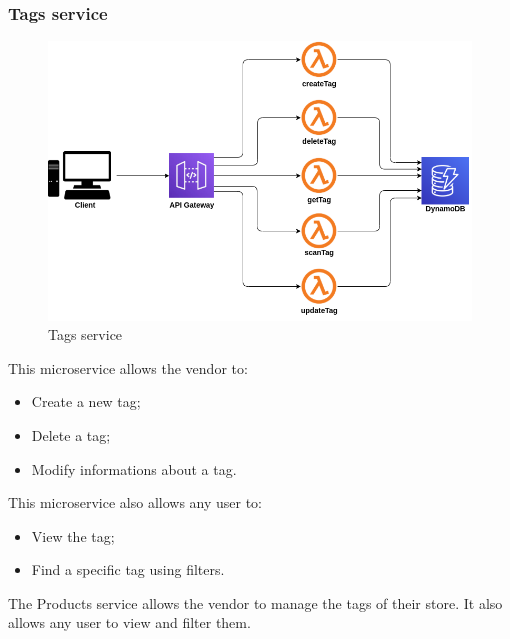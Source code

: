 \subsubsection{Tags service}
\begin{figure}[!h]
    \vspace{5px}
    \includegraphics[scale=0.5]{../../../../Images/Diagrammi/maintainerManual/tagsService.png}
    \centering
    \caption{Tags service}
\end{figure}
This microservice allows the vendor to:
\begin{itemize}
    \item Create a new tag;
    \item Delete a tag;
    \item Modify informations about a tag.
\end{itemize}
This microservice also allows any user to:
\begin{itemize}
    \item View the tag;
    \item Find a specific tag using filters.
\end{itemize}
The Products service allows the vendor to manage the tags of their store. It also allows any user to view and filter them.
\pagebreak
